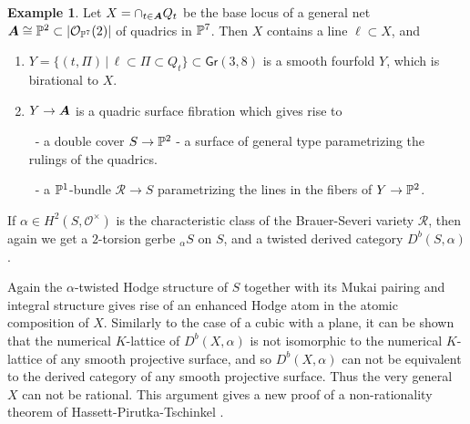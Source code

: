 \documentclass[twoside,leqno]{article}
\numberwithin{equation}{section}
\theoremstyle{plain}
\theoremstyle{definition}
\newtheorem{example}[equation]{Example}
\begin{document}
\begin{example} \label{ex:3quadrics} Let $X = \cap_{t \in \boldsymbol{A}}
  Q_{t}$ be the base locus of a general net $\boldsymbol{A} \cong \mathbb P^{2} \subset
  |\mathcal{O}_{\mathbb P^7}(2)|$ of quadrics in $\mathbb P^7$.
  Then $X$ contains a line $\ell \subset X$, and
\begin{enumerate}[wide]
\item $Y = \{ (t,\Pi) \, | \, \ell \subset \Pi \subset Q_{t} \}
  \subset \mathsf{Gr}(3,8)$  is a smooth 
  fourfold $Y$, which is birational to $X$.
\item $Y \to \boldsymbol{A}$ is a quadric surface fibration
  which gives rise to

  
\ \qquad - a double cover $S \to \mathbb P^2$ - a surface
of general type parametrizing the rulings of the quadrics.

\ \qquad - 
a $\mathbb P^1$-bundle $\mathcal{R} \to S$ parametrizing the
  lines in the fibers of $Y \to \mathbb P^2$.
\end{enumerate}
If $\alpha \in H^2(S,\mathcal{O}^{\times})$ is the characteristic
class of the Brauer-Severi variety $\mathcal{R}$, then again we get 
a $2$-torsion gerbe ${}_{\alpha}S$ on $S$, and a twisted derived category 
$D^{b}(S,\alpha)$.

Again the $\alpha$-twisted Hodge structure of $S$ together with its Mukai pairing and integral structure gives rise of an enhanced Hodge atom in the atomic composition of $X$.
Similarly to the case of a cubic with a plane, it  can be shown  \cite{DonagiPantev-3quadrics} that the numerical $K$-lattice of $D^{b}(X,\alpha)$
is not isomorphic to the numerical $K$-lattice of any smooth projective surface, and so $D^{b}(X,\alpha)$ can not be equivalent to the derived category of any smooth projective surface. Thus the very general $X$ can not be rational. This argument gives a new proof of a non-rationality theorem of Hassett-Pirutka-Tschinkel \cite{HPT-3quadrics}.  
\end{example}
\end{document}
